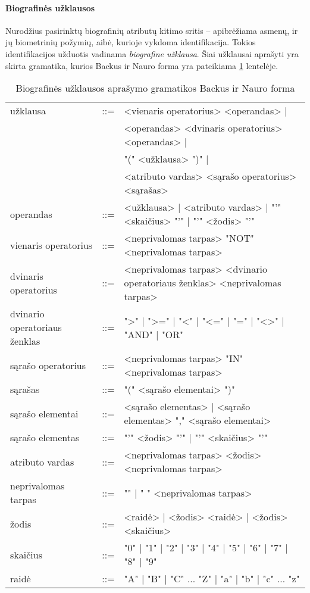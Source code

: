 \paragraph{Biografinės užklausos}

Nurodžius pasirinktų biografinių atributų kitimo sritis -- apibrėžiama asmenų, ir jų biometrinių požymių, aibė, kurioje vykdoma identifikacija.
Tokios identifikacijos užduotis vadinama {\it biografine užklausa}.
Šiai užklausai aprašyti yra skirta gramatika, kurios Backus ir Nauro forma \cite{mccracken2003backus} yra pateikiama \ref{tab:queryBNF} lentelėje.

\begin{table}[H]\footnotesize
	\centering
	\begin{tabular}{|l c l|}
		\hline
		užklausa                      & ::= & <vienaris operatorius> <operandas> | \\
									  &     & \multicolumn{1}{l|}{<operandas> <dvinaris operatorius> <operandas> |} \\
									  &     & \multicolumn{1}{l|}{"(" <užklausa> ")" |} \\
									  &     & \multicolumn{1}{l|}{ <atributo vardas> <sąrašo operatorius> <sąrašas>} \\
		operandas                     & ::= & <užklausa> | <atributo vardas> | "'" <skaičius> "'" | "'" <žodis> "'" \\
		vienaris operatorius          & ::= & <neprivalomas tarpas> "NOT" <neprivalomas tarpas> \\
		dvinaris operatorius          & ::= & <neprivalomas tarpas> <dvinario operatoriaus ženklas> <neprivalomas tarpas> \\
		dvinario operatoriaus ženklas & ::= & ">" | ">=" | "<" | "<=" | "=" | "<>" | "AND" | "OR" \\
		sąrašo operatorius            & ::= & <neprivalomas tarpas> "IN" <neprivalomas tarpas> \\
		sąrašas                       & ::= & "(" <sąrašo elementai> ")" \\
		sąrašo elementai              & ::= & <sąrašo elementas> | <sąrašo elementas> "," <sąrašo elementai> \\
		sąrašo elementas              & ::= & "'" <žodis> "'" | "'" <skaičius> "'" \\
		atributo vardas               & ::= & <neprivalomas tarpas> <žodis> <neprivalomas tarpas> \\
		neprivalomas tarpas           & ::= & "" | " " <neprivalomas tarpas> \\
		žodis                         & ::= & <raidė> | <žodis> <raidė> | <žodis> <skaičius> \\
		skaičius                      & ::= & "0" | "1" | "2" | "3" | "4" | "5" | "6" | "7" | "8" | "9" \\
		raidė                         & ::= & "A" | "B" | "C" ... "Z" | "a" | "b" | "c" ... "z"  \\
		\hline
	\end{tabular}
	\caption{Biografinės užklausos aprašymo gramatikos Backus ir Nauro forma}
	\label{tab:queryBNF}
\end{table}

